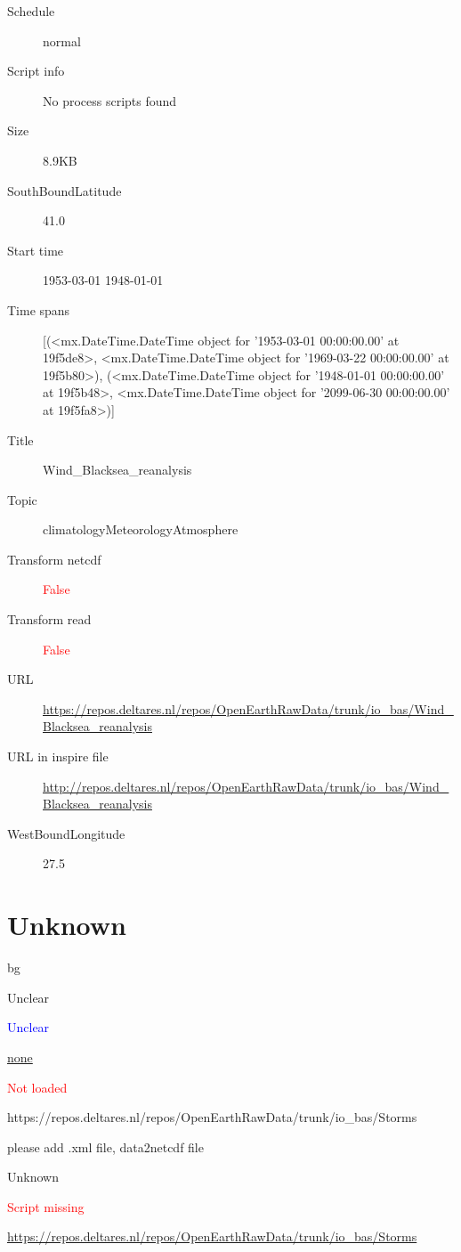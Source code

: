 \documentclass[9]{report}
\begin{document}
\begin{description}
\begin{verbatim}
\end{verbatim}
  \item[Schedule] normal
  \item[Script info] No process scripts found
  \item[Size] 8.9KB
  \item[SouthBoundLatitude] 41.0
  \item[Start time] 1953-03-01 1948-01-01
  \item[Time spans] [(<mx.DateTime.DateTime object for '1953-03-01 00:00:00.00' at 19f5de8>, <mx.DateTime.DateTime object for '1969-03-22 00:00:00.00' at 19f5b80>), (<mx.DateTime.DateTime object for '1948-01-01 00:00:00.00' at 19f5b48>, <mx.DateTime.DateTime object for '2099-06-30 00:00:00.00' at 19f5fa8>)]
  \item[Title]  Wind\_Blacksea\_reanalysis 
  \item[Topic] climatologyMeteorologyAtmosphere
  \item[Transform netcdf] \textcolor{red}{False}
  \item[Transform read] \textcolor{red}{False}
  \item[URL] \href{https://repos.deltares.nl/repos/OpenEarthRawData/trunk/io\_bas/Wind\_Blacksea\_reanalysis}{https://repos.deltares.nl/repos/OpenEarthRawData/trunk/io\_bas/Wind\_Blacksea\_reanalysis}
  \item[URL in inspire file] \href{http://repos.deltares.nl/repos/OpenEarthRawData/trunk/io\_bas/Wind\_Blacksea\_reanalysis}{http://repos.deltares.nl/repos/OpenEarthRawData/trunk/io\_bas/Wind\_Blacksea\_reanalysis}
  \item[WestBoundLongitude] 27.5
\end{description}
\section{Unknown}
\begin{description}
  \setlength{\itemsep}{4pt}
  \setlength{\parskip}{2pt}
  \setlength{\parsep}{2pt}
  \item[Country] bg
  \item[Datatype] Unclear
  \item[Extract] \textcolor{blue}{Unclear}
  \item[Inspire URL] \href{none}{none}
  \item[Load] \textcolor{red}{Not loaded}
  \item[No Inspire URL] https://repos.deltares.nl/repos/OpenEarthRawData/trunk/io\_bas/Storms
  \item[Remarks] please add .xml file, data2netcdf file
  \item[Title] Unknown
  \item[Transform read] \textcolor{red}{Script missing}
  \item[URL] \href{https://repos.deltares.nl/repos/OpenEarthRawData/trunk/io\_bas/Storms}{https://repos.deltares.nl/repos/OpenEarthRawData/trunk/io\_bas/Storms}
  \item[period included] 
\end{description}
\end{document}
